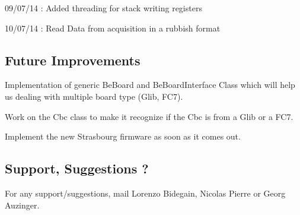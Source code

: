 \begin{DoxyItemize}
\item 09/07/14 \-: Added threading for stack writing registers
\item 10/07/14 \-: Read Data from acquisition in a rubbish format
\end{DoxyItemize}

\subsection*{Future Improvements }


\begin{DoxyItemize}
\item Implementation of generic Be\-Board and Be\-Board\-Interface Class which will help us dealing with multiple board type (Glib, F\-C7).
\item Work on the Cbc class to make it recognize if the Cbc is from a Glib or a F\-C7.
\item Implement the new Strasbourg firmware as soon as it comes out.
\end{DoxyItemize}

\subsection*{Support, Suggestions ? }

For any support/suggestions, mail Lorenzo Bidegain, Nicolas Pierre or Georg Auzinger. 